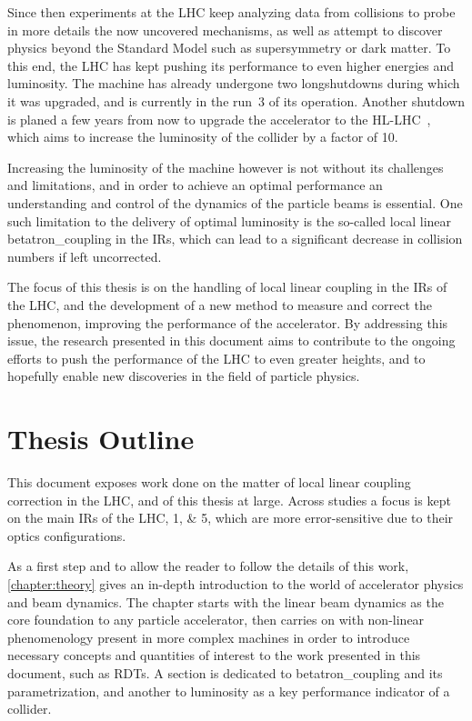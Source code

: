 Since then experiments at the \gls{LHC} keep analyzing data from collisions to probe in more details the now uncovered mechanisms, as well as attempt to discover physics beyond the Standard Model such as supersymmetry or dark matter.
To this end, the LHC has kept pushing its performance to even higher energies and \gls{luminosity}.
The machine has already undergone two \glspl{longshutdown} during which it was upgraded, and is currently in the \Gls{run}~\num{3} of its operation.
Another shutdown is planed a few years from now to upgrade the accelerator to the \gls{HL-LHC}~\cite{Website:HLLHC}, which aims to increase the \gls{luminosity} of the collider by a factor of \num{10}.

Increasing the luminosity of the machine however is not without its challenges and limitations, and in order to achieve an optimal performance an understanding and control of the dynamics of the particle beams is essential.
One such limitation to the delivery of optimal \gls{luminosity} is the so-called local linear \gls{betatron_coupling} in the \glspl{IR}, which can lead to a significant decrease in collision numbers if left uncorrected.

The focus of this thesis is on the handling of local linear coupling in the \glspl{IR} of the \gls{LHC}, and the development of a new method to measure and correct the phenomenon, improving the performance of the accelerator.
By addressing this issue, the research presented in this document aims to contribute to the ongoing efforts to push the performance of the \gls{LHC} to even greater heights, and to hopefully enable new discoveries in the field of particle physics.

\section{Thesis Outline}

This document exposes work done on the matter of local linear coupling correction in the LHC, and of this thesis at large.
Across studies a focus is kept on the main \glspl{IR} of the \gls{LHC}, \numlist{1;5}, which are more error-sensitive due to their optics configurations.

As a first step and to allow the reader to follow the details of this work, \cref{chapter:theory} gives an in-depth introduction to the world of accelerator physics and beam dynamics.
The chapter starts with the linear beam dynamics as the core foundation to any particle accelerator, then carries on with non-linear phenomenology present in more complex machines in order to introduce necessary concepts and quantities of interest to the work presented in this document, such as \glspl{RDT}.
A section is dedicated to \gls{betatron_coupling} and its parametrization, and another to \gls{luminosity} as a key performance indicator of a collider.

